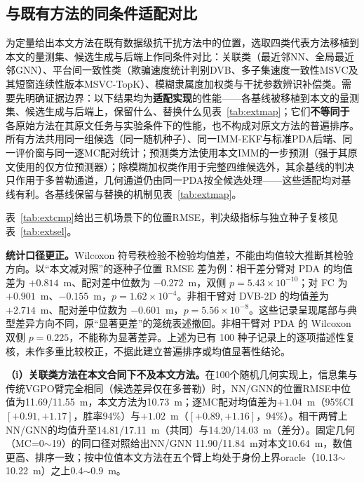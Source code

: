 \documentclass[UTF8,a4paper,zihao=-4]{ctexart}
\begin{document}
\subsection{与既有方法的同条件适配对比}\label{sec:external}
为定量给出本文方法在既有数据级抗干扰方法中的位置，选取四类代表方法移植到本文的量测集、候选生成与后端上作同条件对比：关联类（最近邻NN、全局最近邻GNN）、平台间一致性类（欺骗速度统计判别DVB\cite{li2024}、多子集速度一致性MSVC及其短窗连续性版本MSVC-TopK\cite{renVG2026}）、模糊隶属度加权类\cite{rough2018}与干扰参数辨识补偿类\cite{zhao2024,lingadevaru2022}。需要先明确证据边界：以下结果均为\textbf{适配实现}的性能——各基线被移植到本文的量测集、候选生成与后端上，保留什么、替换什么见表~\ref{tab:extmap}；它们\textbf{不等同于}各原始方法在其原文任务与实验条件下的性能，也不构成对原文方法的普遍排序。所有方法共用同一组候选（同一随机种子）、同一IMM-EKF与标准PDA后端、同一评价窗与同一逐MC配对统计；预测类方法使用本文IMM的一步预测（强于其原文使用的仅方位预测器）；除模糊加权类作用于完整四维候选外，其余基线的判决只作用于多普勒通道，几何通道仍由同一PDA按全候选处理——这些适配均对基线有利。各基线保留与替换的机制见表~\ref{tab:extmap}。



表~\ref{tab:extcmp}给出三机场景下的位置RMSE，判决级指标与独立种子复核见表~\ref{tab:extsel}。

\textbf{统计口径更正。}Wilcoxon 符号秩检验不检验均值差，不能由均值较大推断其检验方向。以“本文减对照”的逐种子位置 RMSE 差为例：相干差分臂对 PDA 的均值差为 $+0.814$~m、配对差中位数为 $-0.272$~m，双侧 $p=5.43\times10^{-10}$；对 FC 为 $+0.901$~m、$-0.155$~m，$p=1.62\times10^{-4}$。非相干臂对 DVB-2D 的均值差为 $+2.714$~m、配对差中位数为 $-0.601$~m，$p=5.56\times10^{-8}$。这些记录呈现尾部与典型差异方向不同，原“显著更差”的笼统表述撤回。非相干臂对 PDA 的 Wilcoxon 双侧 $p=0.225$，不能称为显著差异。上述为已有 100 种子记录上的逐项描述性复核，未作多重比较校正，不据此建立普遍排序或均值显著性结论。

\noindent\textbf{（i）关联类方法在本文合同下不及本文方法。}\quad 在100个随机几何实现上，信息集与传统VGPO臂完全相同（候选差异仅在多普勒）时，NN/GNN的位置RMSE中位值为11.69/11.55~m，本文方法为10.73~m；逐MC配对均值差为$+1.04$~m（95\%CI $[+0.91,+1.17]$，胜率94\%）与$+1.02$~m（$[+0.89,+1.16]$，94\%）。相干两臂上NN/GNN的均值升至14.81/17.11~m（共同）与14.20/14.03~m（差分）。固定几何（MC=0$\sim$19）的同口径对照给出NN/GNN 11.90/11.84~m对本文10.64~m，数值更高、排序一致；按中位值本文方法在五个臂上均处于身份上界oracle（10.13$\sim$10.22~m）之上0.4$\sim$0.9~m。
\end{document}
